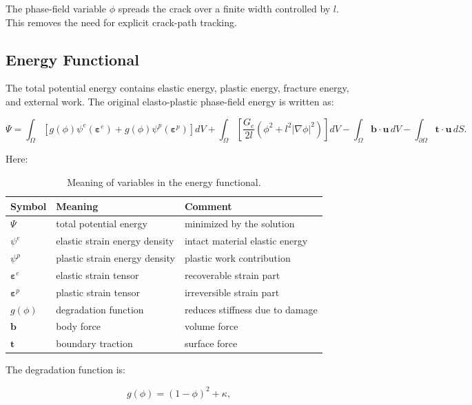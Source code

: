 \documentclass[11pt,a4paper]{article}
\begin{document}
The phase-field variable $\phi$ spreads the crack over a finite width controlled by $l$. This removes the need for explicit crack-path tracking.

\subsection{Energy Functional}

The total potential energy contains elastic energy, plastic energy, fracture energy, and external work. The original elasto-plastic phase-field energy is written as:

\begin{equation}
\Psi =
\int_{\Omega}
\left[
 g(\phi)\psi^e(\bm{\varepsilon}^e)
+
 g(\phi)\psi^p(\bm{\varepsilon}^p)
\right] dV
+
\int_{\Omega}
\left[
\frac{G_c}{2l}
\left(
\phi^2 + l^2|\nabla \phi|^2
\right)
\right] dV
-
\int_{\Omega}\bm{b}\cdot \bm{u}\,dV
-
\int_{\partial \Omega}\bm{t}\cdot \bm{u}\,dS .
\end{equation}

Here:

\begin{table}[H]
\centering
\caption{Meaning of variables in the energy functional.}
\begin{tabular}{lll}
\toprule
Symbol & Meaning & Comment \\
\midrule
$\Psi$ & total potential energy & minimized by the solution \\
$\psi^e$ & elastic strain energy density & intact material elastic energy \\
$\psi^p$ & plastic strain energy density & plastic work contribution \\
$\bm{\varepsilon}^e$ & elastic strain tensor & recoverable strain part \\
$\bm{\varepsilon}^p$ & plastic strain tensor & irreversible strain part \\
$g(\phi)$ & degradation function & reduces stiffness due to damage \\
$\bm{b}$ & body force & volume force \\
$\bm{t}$ & boundary traction & surface force \\
\bottomrule
\end{tabular}
\end{table}

The degradation function is:

\begin{equation}
g(\phi) = (1-\phi)^2 + \kappa ,
\end{equation}
\end{document}
